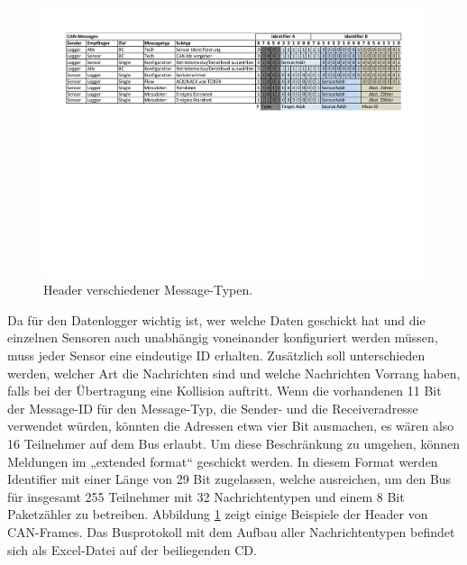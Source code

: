 \begin{figure}
	\centering
		\includegraphics[height=0.9\textheight]{images/canmess.pdf}
	\caption{Header verschiedener Message-Typen.}
	\label{fig.canmess}
\end{figure}

Da für den Datenlogger wichtig ist, wer welche Daten geschickt hat und die einzelnen Sensoren auch unabhängig voneinander konfiguriert werden müssen, muss jeder Sensor eine eindeutige ID erhalten. Zusätzlich soll unterschieden werden, welcher Art die Nachrichten sind und welche Nachrichten Vorrang haben, falls bei der Übertragung eine Kollision auftritt. Wenn die vorhandenen 11 Bit der Message-ID für den Message-Typ, die Sender- und die Receiveradresse verwendet würden, könnten die Adressen etwa vier Bit ausmachen, es wären also 16 Teilnehmer auf dem Bus erlaubt. Um diese Beschränkung zu umgehen, können Meldungen im „extended format“ geschickt werden. In diesem Format werden Identifier mit einer Länge von 29 Bit zugelassen, welche ausreichen, um den Bus für insgesamt 255 Teilnehmer mit 32 Nachrichtentypen und einem 8 Bit Paketzähler zu  betreiben. Abbildung \ref{fig.canmess} zeigt einige Beispiele der Header von CAN-Frames. Das Busprotokoll mit dem Aufbau aller Nachrichtentypen befindet sich als Excel-Datei auf der beiliegenden CD.


